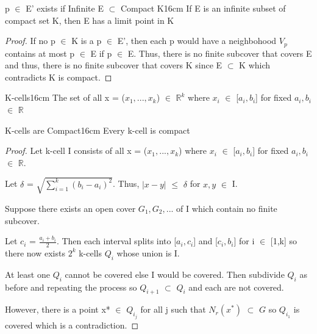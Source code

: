 	\vspace{0.5cm}



	\begin{wtheorem}{p $\in$ E' exists if
	Infinite E $\subset$ Compact K}{16cm}
		If E is an infinite subset of compact set K, then E has a
		limit point in K
	\end{wtheorem}
	
	\begin{proof}
		If no p $\in$ K is a p $\in$ E', then each p would have
		a neighbohood $V_p$ contains at most p $\in$ E if p $\in$ E.
		Thus, there is no finite subcover that covers E and thus,
		there is no finite subcover that covers K since E $\subset$ K
		which contradicts K is compact.
	\end{proof}

	\vspace{0.5cm}


	 
	\begin{definition}{K-cells}{16cm}
		The set of all x = ($x_1, ... , x_k$) $\in$ $\mathbb{R}^k$
		where $x_i$ $\in$ [$a_i,b_i$] for fixed $a_i,b_i$ $\in$ $\mathbb{R}$ 
	\end{definition}
	
	\vspace{0.5cm}



	\begin{wtheorem}{K-cells are Compact}{16cm}
		Every k-cell is compact
	\end{wtheorem}
	
	\begin{proof}
		Let k-cell I consists of all x = ($x_1, ... , x_k$) where
		$x_i$ $\in$ [$a_i,b_i$] for fixed $a_i,b_i$ $\in$ $\mathbb{R}$.

		Let $\delta$ = $\sqrt{\sum_{i=1}^{k} (b_i - a_i)^2}$.
		Thus, $|x-y|$ $\leq$ $\delta$ for $x,y$ $\in$ I.

		Suppose there exists an open cover $G_1, G_2, ...$ of I which
		contain no finite subcover.

		Let $c_i$ = $\frac{a_i+b_i}{2}$.
		Then each interval splits into [$a_i,c_i$] and [$c_i,b_i$]
		for i $\in$ [1,k] so there now exists $2^k$ k-cells $Q_i$
		whose union is I.

		At least one $Q_i$ cannot be covered else I would be covered.
		Then subdivide $Q_i$ as before and repeating the process
		so $Q_{i+1}$ $\subset$ $Q_i$ and each are not covered.

		However, there is a point x* $\in$ $Q_{i_j}$ for all j
		such that $N_r(x^*)$ $\subset$ $G$ so $Q_{i_1}$ is covered
		which is a contradiction.
	\end{proof}

